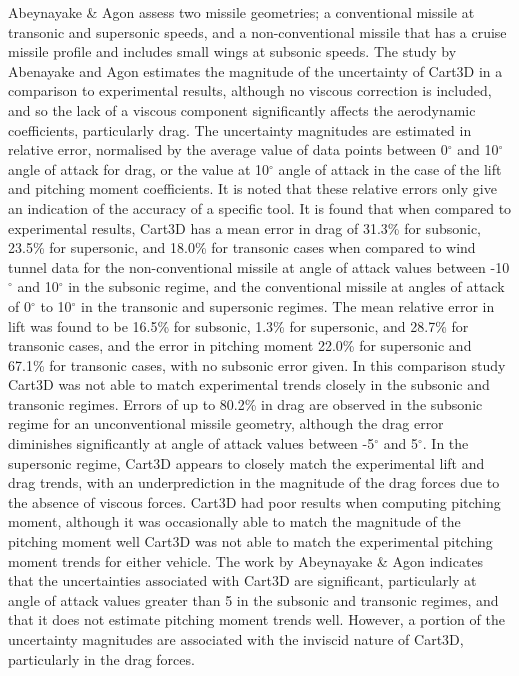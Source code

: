 Abeynayake \& Agon assess two missile geometries; a conventional missile at transonic and supersonic speeds, and a non-conventional missile that has a cruise missile profile and includes small wings at subsonic speeds\cite{Abeynayake2013a}. The study by Abenayake and Agon estimates the magnitude of the uncertainty of Cart3D in a comparison to experimental results, although no viscous correction is included, and so the lack of a viscous component significantly affects the aerodynamic coefficients, particularly drag. The uncertainty magnitudes are estimated in relative error, normalised by the average value of data points between 0$^\circ$ and 10$^\circ$ angle of attack for drag, or the value at 10$^\circ$ angle of attack in the case of the lift and pitching moment coefficients\cite{Abeynayake2013a}. It is noted that these relative errors only give an indication of the accuracy of a specific tool\cite{Abeynayake2013a}. It is found that when compared to experimental results, Cart3D has a mean error in drag of 31.3\% for subsonic, 23.5\% for supersonic, and 18.0\% for transonic cases\cite{Abeynayake2013a} when compared to wind tunnel data for the non-conventional missile at angle of attack values between -10$^\circ$ and 10$^\circ$ in the subsonic regime, and the conventional missile at angles of attack of 0$^\circ$ to 10$^\circ$ in the transonic and supersonic regimes. The mean relative error in lift was found to be 16.5\% for subsonic, 1.3\% for supersonic, and 28.7\% for transonic cases\cite{Abeynayake2013a}, and the error in pitching moment 22.0\% for supersonic and 67.1\% for transonic cases, with no subsonic error given\cite{Abeynayake2013a}.
In this comparison study Cart3D was not able to match experimental trends closely in the subsonic and transonic regimes. Errors of up to 80.2\% in drag are observed in the subsonic regime for an unconventional missile geometry\cite{Abeynayake2013a}, although the drag error diminishes significantly at angle of attack values between -5$^\circ$ and 5$^\circ$. In the supersonic regime, Cart3D appears to closely match the experimental lift and drag trends, with an underprediction in the magnitude of the drag forces due to the absence of viscous forces. 
Cart3D had poor results when computing pitching moment, although it was occasionally able to match the magnitude of the pitching moment well Cart3D was not able to match the experimental pitching moment trends for either vehicle\cite{Abeynayake2013a}. The work by Abeynayake \& Agon indicates that the uncertainties associated with Cart3D are significant, particularly at angle of attack values greater than 5 in the subsonic and transonic regimes, and that it does not estimate pitching moment trends well. However, a portion of the uncertainty magnitudes are associated with the inviscid nature of Cart3D, particularly in the drag forces.


